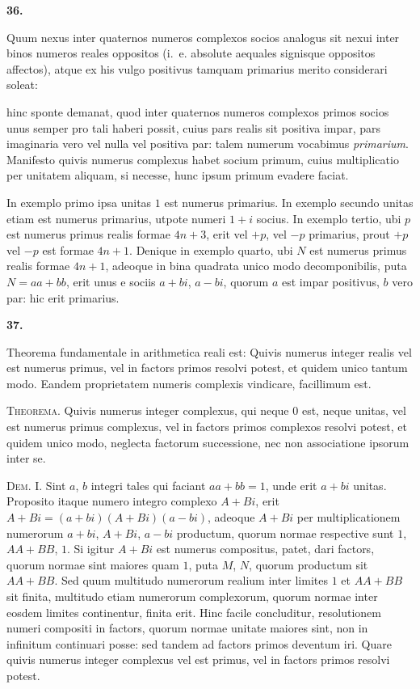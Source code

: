 \documentclass[12pt,a4paper]{article}
\newcommand{\art}[1]{\begin{center}\textbf{#1.}\end{center}}
\begin{document}
\art{36}

Quum nexus inter quaternos numeros complexos socios analogus sit nexui inter binos numeros reales oppositos (i.~e. absolute aequales signisque oppositos affectos), atque ex his vulgo positivus tamquam primarius merito considerari soleat:

hinc sponte demanat, quod inter quaternos numeros complexos primos socios unus semper pro tali haberi possit, cuius pars realis sit positiva impar, pars imaginaria vero vel nulla vel positiva par: talem numerum vocabimus \textit{primarium}. Manifesto quivis numerus complexus habet socium primum, cuius multiplicatio per unitatem aliquam, si necesse, hunc ipsum primum evadere faciat.

In exemplo primo ipsa unitas $1$ est numerus primarius. In exemplo secundo unitas etiam est numerus primarius, utpote numeri $1+i$ socius. In exemplo tertio, ubi $p$ est numerus primus realis formae $4n+3$, erit vel $+p$, vel $-p$ primarius, prout $+p$ vel $-p$ est formae $4n+1$. Denique in exemplo quarto, ubi $N$ est numerus primus realis formae $4n+1$, adeoque in bina quadrata unico modo decomponibilis, puta $N=aa+bb$, erit unus e sociis $a+bi$, $a-bi$, quorum $a$ est impar positivus, $b$ vero par: hic erit primarius.

\art{37}

Theorema fundamentale in arithmetica reali est: Quivis numerus integer realis vel est numerus primus, vel in factors primos resolvi potest, et quidem unico tantum modo. Eandem proprietatem numeris complexis vindicare, facillimum est.

\textsc{Theorema.} Quivis numerus integer complexus, qui neque $0$ est, neque unitas, vel est numerus primus complexus, vel in factors primos complexos resolvi potest, et quidem unico modo, neglecta factorum successione, nec non associatione ipsorum inter se.

\textsc{Dem.} I. Sint $a$, $b$ integri tales qui faciant $aa+bb=1$, unde erit $a+bi$ unitas. Proposito itaque numero integro complexo $A+Bi$, erit $A+Bi=(a+bi)(A+Bi)(a-bi)$, adeoque $A+Bi$ per multiplicationem numerorum $a+bi$, $A+Bi$, $a-bi$ productum, quorum normae respective sunt $1$, $AA+BB$, $1$. Si igitur $A+Bi$ est numerus compositus, patet, dari factors, quorum normae sint maiores quam $1$, puta $M$, $N$, quorum productum sit $AA+BB$. Sed quum multitudo numerorum realium inter limites $1$ et $AA+BB$ sit finita, multitudo etiam numerorum complexorum, quorum normae inter eosdem limites continentur, finita erit. Hinc facile concluditur, resolutionem numeri compositi in factors, quorum normae unitate maiores sint, non in infinitum continuari posse: sed tandem ad factors primos deventum iri. Quare quivis numerus integer complexus vel est primus, vel in factors primos resolvi potest.
\end{document}
